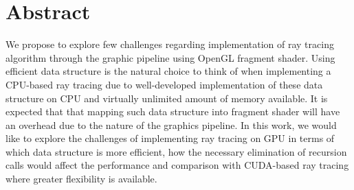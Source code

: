 \section{Abstract}
We propose to explore few challenges regarding implementation of ray tracing algorithm through the graphic pipeline using OpenGL fragment shader. Using efficient data structure is the natural choice to think of when implementing a CPU-based ray tracing due to well-developed implementation of these data structure on CPU and virtually unlimited amount of memory available. It is expected that that mapping such data structure into fragment shader will have an overhead due to the nature of the graphics pipeline. In this work, we would like to explore the challenges of implementing ray tracing on GPU in terms of which data structure is more efficient, how the necessary elimination of recursion calls would affect the performance and comparison with CUDA-based ray tracing where greater flexibility is available. 